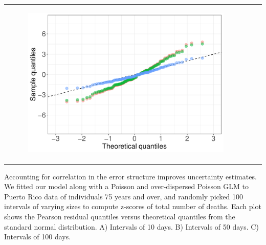 \documentclass[11pt]{article}
\begin{document}
\begin{suppfigure}[ht]
\begin{tabular}{lll}
\begin{subfigure}[t]{0.3\linewidth}
		\includegraphics[width=1\linewidth]{figs/figure-5c.pdf}
	\end{subfigure}\\
	\end{tabular}
	\caption{Accounting for correlation in the error structure improves uncertainty estimates. We fitted our model along with a Poisson and over-dispersed Poisson GLM to Puerto Rico data of individuals 75 years and over, and randomly picked 100 intervals of varying sizes to compute z-scores of total number of deaths. Each plot shows the Pearson residual quantiles versus theoretical quantiles from the standard normal distribution. A) Intervals of 10 days. B) Intervals of 50 days. C) Intervals of 100 days.}
	\label{supp-fig:deaths-qqplots}
\end{suppfigure}
\end{document}

